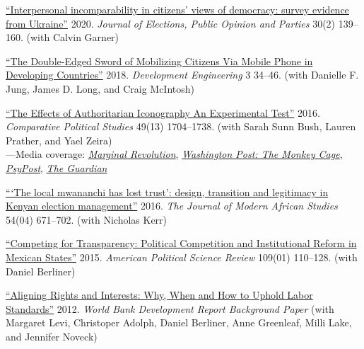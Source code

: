 \begin{etaremune}
  \item \href{https://figshare.com/articles/journal_contribution/Interpersonal_incomparability_in_citizens_views_of_democracy_survey_evidence_from_Ukraine/7447601}{``Interpersonal incomparability in citizens’ views of democracy: survey evidence from Ukraine''} 2020. \textit{Journal of Elections, Public Opinion and Parties} 30(2) 139–160. (with Calvin Garner)

  \item \href{https://doi.org/10.1016/j.deveng.2017.11.001}{``The Double-Edged Sword of Mobilizing Citizens Via Mobile Phone in Developing Countries''} 2018. \textit{Development Engineering} 3 34–46. (with Danielle F. Jung, James D. Long, and Craig McIntosh)

  \item \href{https://escholarship.org/uc/item/7492b1tt}{``The Effects of Authoritarian Iconography An Experimental Test''} 2016. \textit{Comparative Political Studies} 49(13) 1704–1738. (with Sarah Sunn Bush, Lauren Prather, and Yael Zeira) \\
    ---Media coverage: \href{https://marginalrevolution.com/marginalrevolution/2016/07/results-free-review.html}{\textit{Marginal Revolution}}, \href{https://www.washingtonpost.com/news/monkey-cage/wp/2016/08/25/heres-what-happens-when-scientists-evaluate-research-without-knowing-the-results/}{\textit{Washington Post: The Monkey Cage}}, \href{https://www.psypost.org/2016/12/scientists-investigate-subliminal-authoritarian-imagery-encourages-citizens-obey-46570}{\textit{PsyPost}}, \href{https://www.theguardian.com/commentisfree/2026/jun/04/the-guardian-view-on-trumps-omnipresence-commanding-attention-like-a-king}{\textit{The Guardian}}

  \item \href{https://doi.org/10.1017/S0022278X16000604}{``‘The local mwananchi has lost trust’: design, transition and legitimacy in Kenyan election management''} 2016. \textit{The Journal of Modern African Studies} 54(04) 671–702. (with Nicholas Kerr)

  \item \href{https://doi.org/10.1017/S0003055414000616}{``Competing for Transparency: Political Competition and Institutional Reform in Mexican States''} 2015. \textit{American Political Science Review} 109(01) 110–128. (with Daniel Berliner)

  \item \href{https://faculty.washington.edu/cadolph/articles/wdr2013rights.pdf}{``Aligning Rights and Interests: Why, When and How to Uphold Labor Standards''} 2012. \textit{World Bank Development Report Background Paper} (with Margaret Levi, Christoper Adolph, Daniel Berliner, Anne Greenleaf, Milli Lake, and Jennifer Noveck)

\end{etaremune}

